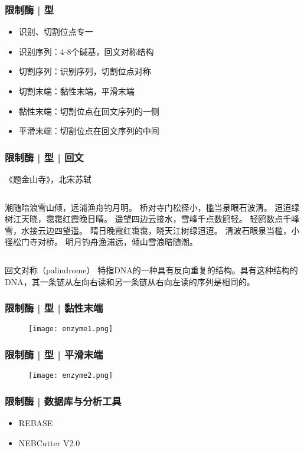 \begin{frame}
	\frametitle{限制酶 | 型}
	\begin{itemize}
		\item 识别、切割位点专一
		\item 识别序列：4-8个碱基，回文对称结构
		\item 切割序列：识别序列，切割位点对称
		\item 切割末端：黏性末端，平滑末端
		\item 黏性末端：切割位点在回文序列的一侧
		\item 平滑末端：切割位点在回文序列的中间
	\end{itemize}
\end{frame}

\begin{frame}
	\frametitle{限制酶 | 型 | 回文}
	\begin{block}{《题金山寺》，北宋\textbullet 苏轼}
	\begin{columns}
潮随暗浪雪山倾，远浦渔舟钓月明。
桥对寺门松径小，槛当泉眼石波清。
迢迢绿树江天晓，霭霭红霞晚日晴。
遥望四边云接水，雪峰千点数鸥轻。
		\pause
轻鸥数点千峰雪，水接云边四望遥。
晴日晚霞红霭霭，晓天江树绿迢迢。
清波石眼泉当槛，小径松门寺对桥。
明月钓舟渔浦远，倾山雪浪暗随潮。
	\end{columns}
	\end{block}
	\pause
	\begin{block}{回文对称（palindrome）}
		特指DNA的一种具有反向重复的结构。具有这种结构的DNA，其一条链从左向右读和另一条链从右向左读的序列是相同的。
	\end{block}
\end{frame}

\begin{frame}
	\frametitle{限制酶 | 型 | 黏性末端}
	\begin{figure}
		\centering
		\texttt{[image: enzyme1.png]}
	\end{figure}
\end{frame}

\begin{frame}
	\frametitle{限制酶 | 型 | 平滑末端}
	\begin{figure}
		\centering
		\texttt{[image: enzyme2.png]}
	\end{figure}
\end{frame}

\begin{frame}
	\frametitle{限制酶 | 数据库与分析工具}
	\begin{itemize}
		\item REBASE
		\item NEBCutter V2.0
	\end{itemize}
\end{frame}

